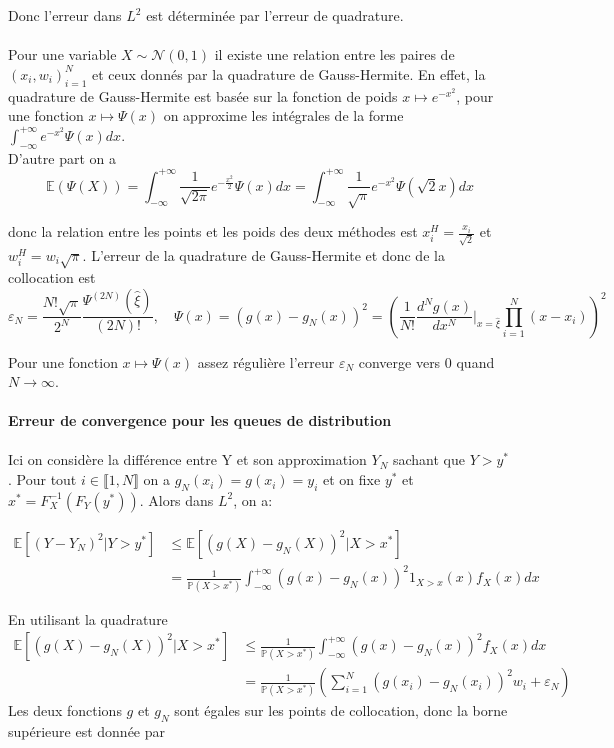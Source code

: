 \documentclass[a4paper,12pt]{report}
\numberwithin{equation}{section}
\theoremstyle{definition}
\numberwithin{equation}{section}
\begin{document}
Donc l'erreur dans $L^{2}$ est déterminée par l'erreur de quadrature.
\\\\
Pour une variable $X\sim\mathcal{N}(0,1)$ il existe une relation entre les paires de $\left({x_{i},w_{i}}\right)_{i=1}^{N}$ et ceux donnés par la quadrature de Gauss-Hermite. En effet, la quadrature de Gauss-Hermite est basée sur la fonction de poids $x\mapsto e^{-x^{2}}$, pour une fonction $x\mapsto\Psi(x)$ on approxime les intégrales de la forme $\displaystyle \int_{-\infty}^{+\infty}e^{-x^{2}}\Psi(x)dx$.
\\
D'autre part on a $$\mathbb{E}(\Psi(X))=\int_{-\infty}^{+\infty}\frac{1}{\sqrt{2\pi}}e^{-\frac{x^{2}}{2}}\Psi(x)dx=\int_{-\infty}^{+\infty}\frac{1}{\sqrt{\pi}}e^{-x^{2}}\Psi(\sqrt{2}x)dx$$

donc la relation entre les points et les poids des deux méthodes est $x_{i}^{H}=\frac{x_{i}}{\sqrt{2}}$ et $w_{i}^{H}=w_{i}\sqrt{\pi}$. L'erreur de la quadrature de Gauss-Hermite et donc de la collocation est $$\varepsilon_{N}=\frac{N!\sqrt{\pi}}{2^{N}}\frac{\Psi^{(2N)}(\hat{\xi})}{(2N)!},\quad\Psi(x)=(g(x)-g_{N}(x))^{2}=\left(\frac{1}{N!}\frac{d^{N}g(x)}{dx^{N}}\bigg|_{x=\hat{\xi}}\prod_{i=1}^{N}(x-x_{i})\right)^{2}$$

Pour une fonction $x\mapsto\Psi(x)$ assez régulière l'erreur $\varepsilon_{N}$ converge vers 0 quand $N\to\infty$.
\\\\
\textbf{Erreur de convergence pour les queues de distribution}
\\\\
Ici on considère la différence entre Y et son approximation $Y_{N}$ sachant que $Y> y^*$. Pour tout $i\in\llbracket1,N\rrbracket$ on a $g_{N}(x_{i})=g(x_{i})=y_{i}$ et on fixe $y^{*}$ et $x^{*}=F_{X}^{-1}(F_{Y}(y^{*}))$. Alors dans $L^{2}$, on a:

\begin{equation*}
\begin{split}
\mathbb{E}\left[(Y-Y_{N})^{2}|Y>y^{*}\right] & \leq \mathbb{E}\left[(g(X)-g_{N}(X))^{2}|X>x^{*}\right]\\
 & =\frac{1}{\mathbb{P}(X>x^{*})}\int_{-\infty}^{+\infty}(g(x)-g_{N}(x))^{2}1_{X>x}(x)f_{X}(x)dx
\end{split}
\end{equation*}

En utilisant la quadrature
\begin{equation*}
\begin{split}
\mathbb{E}\left[(g(X)-g_{N}(X))^{2}|X>x^{*}\right]& \leq\frac{1}{\mathbb{P}(X>x^{*})}\int_{-\infty}^{+\infty}(g(x)-g_{N}(x))^{2}f_{X}(x)dx\\
&=\frac{1}{\mathbb{P}(X>x^{*})}\left(\sum_{i=1}^{N}(g(x_{i})-g_{N}(x_{i}))^{2}w_{i}+\varepsilon_{N}\right)
\end{split}
\end{equation*}
Les deux fonctions $g$ et $g_{N}$ sont égales sur les points de collocation, donc la borne supérieure est donnée par
\end{document}
